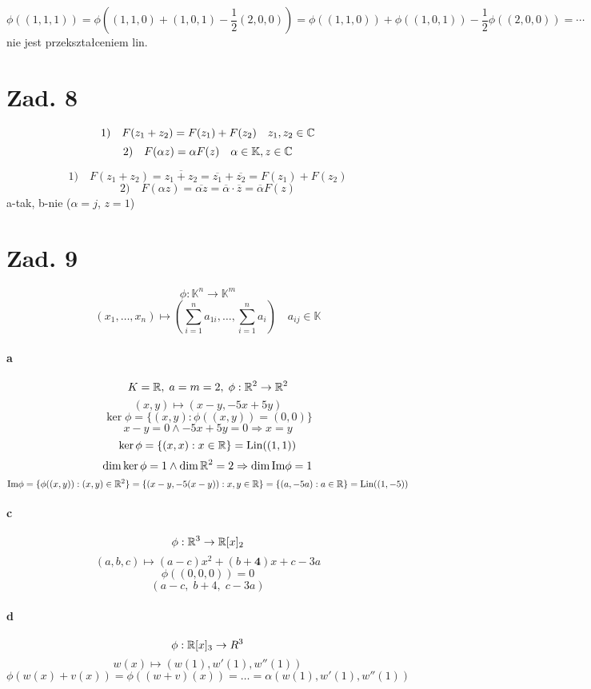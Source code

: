 \documentclass[a4paper,fleqn]{article}
\begin{document}
	\[ \phi((1,1,1)) = \phi((1,1,0)+(1,0,1)-\frac 1 2 (2,0,0)) =
		\phi((1,1,0)) + \phi((1,0,1)) - \frac 1 2 \phi((2,0,0)) = \cdots \]
	nie jest przekształceniem lin.

	\section*{Zad. 8}
	\[ 1)\quad F(z_1+z_2) = F(z_1)+F(z_2) \quad z_1, z_2 \in \mathbb{C} \]
	\[ 2)\quad F(\alpha z) = \alpha F(z) \quad \alpha \in \mathbb{K}, z \in \mathbb{C} \]

	\[ 1)\quad F(z_1 + z_2) = \overline{z_1+z_2} = \overline{z_1} + \overline{z_2} = F(z_1) + F(z_2) \]
	\[ 2)\quad F(\alpha z) = \overline{\alpha z} = \overline{\alpha} \cdot \overline{z} = \overline{\alpha} F(z) \]
	a-tak, b-nie ($\alpha = j$, $z = 1$)

	\section*{Zad. 9}
	\[ \phi : \mathbb{K}^n \to \mathbb{K}^m \]
	\[ (x_1, \ldots, x_n) \mapsto
		(\sum^n_{i=1} a_{1i}, \ldots, \sum^n_{i=1} a_{i})
		\quad a_{ij} \in \mathbb{K} \]
	\paragraph{a}
	\[ K = \mathbb{R}, \; a=m=2, \; \phi : \mathbb{R}^2 \to \mathbb{R}^2 \]
	\[ (x,y) \mapsto (x-y, -5x+5y) \]
	\[ \ker \phi = \{ (x,y):\phi((x,y)) = (0,0) \} \]
	\[ x-y=0 \land -5x+5y = 0 \Rightarrow x = y \]
	\[ \ker \phi = \{ (x,x) : x\in\mathbb{R} \} = \text{Lin}((1,1)) \]
	\[ \dim \ker \phi = 1 \land \dim \mathbb{R}^2 = 2 \Rightarrow \dim \text{Im} \phi = 1 \]
	\[ \text{Im} \phi = \{ \phi((x,y)) : (x,y) \in \mathbb{R}^2 \} =
		\{ (x-y, -5(x-y)) : x,y\in\mathbb{R} \} = \{ (a,-5a) : a\in\mathbb{R} \} = \text{Lin}((1,-5)) \]

	\paragraph{c}
	\[ \phi : \mathbb{R}^3 \to \mathbb{R}[x]_2 \]
	\[ (a,b,c) \mapsto (a-c)x^2 + (b+\textbf{4})x + c - 3a \]
	\[ \phi ((0,0,0)) = 0 \]
	\[ (a-c,\;b+4,\;c-3a) \]

	\paragraph{d}
	\[ \phi : \mathbb{R}[x]_3 \to R^3 \]
	\[ w(x) \mapsto (w(1), w'(1), w''(1)) \]
	\[ \phi( w(x)+ v(x) ) = \phi ((w+v)(x)) = \ldots = \alpha(w(1),w'(1),w''(1)) \]
\end{document}
